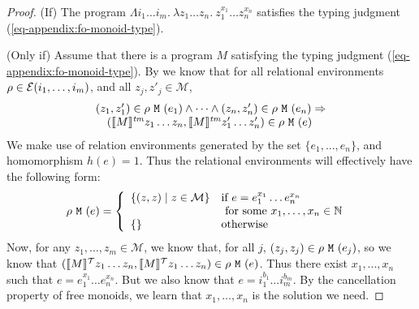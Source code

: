 \begin{proof}
  (If) The program $\Lambda i_1\dots i_m.\ \lambda z_1\dots z_n.\
  z_1^{x_1}\dots z_n^{x_n}$ satisfies the typing judgment
  (\ref{eq-appendix:fo-monoid-type}).

  (Only if) Assume that there is a program $M$ satisfying the typing
  judgment (\ref{eq-appendix:fo-monoid-type}). By
   we know that for all relational
  environments $\rho \in \mathcal{E}(i_1,\dots,i_m)$, and all $z_j,z'_j
  \in \mathcal{M}$,
  \begin{displaymath}
    \begin{array}{l}
      (z_1,z'_1) \in \rho\ \tyPrimNm{M}\ (e_1) \land \dots \land (z_n,z'_n) \in \rho\ \tyPrimNm{M}\ (e_n) \Rightarrow \\
      \quad (\tmSem{M}z_1\dots z_n, \tmSem{M}z'_1\dots z'_n) \in \rho\ \tyPrimNm{M}\ (e)
    \end{array}
  \end{displaymath}
  We make use of relation environments generated by the set
  $\{e_1,...,e_n\}$, and homomorphism $h(e) = 1$. Thus the relational
  environments will effectively have the following form:
  \begin{displaymath}
    \rho\ \tyPrimNm{M}\ (e) = \left\{
      \begin{array}{ll}
        \{(z,z) \sepbar z \in \mathcal{M} \} &
        \begin{array}[t]{@{}l}
          \textrm{if}\ e = e_1^{x_1}\dots e_n^{x_n} \\
          \textrm{ for some }x_1,\dots,x_n \in \mathbb{N}
        \end{array}
        \\
        \{\} & \textrm{otherwise}
      \end{array}
    \right.
  \end{displaymath}
  Now, for any $z_1,\dots,z_m \in \mathcal{M}$, we know that, for all
  $j$, $(z_j,z_j) \in \rho\ \tyPrimNm{M}\ (e_j)$, so we know that
  $(\llbracket M \rrbracket^{\mathcal{T}}z_1\dots z_n, \llbracket M \rrbracket^{\mathcal{T}}z_1 \dots z_n) \in \rho\
  \textup{\texttt{M}}\ (e)$. Thus there exist $x_1,...,x_n$ such that $e =
  e_1^{x_1}\dots e_n^{x_n}$. But we also know that $e =
  i_1^{b_1}...i_m^{b_m}$. By the cancellation property of free
  monoids, we learn that $x_1,...,x_n$ is the solution we need.
\end{proof}


